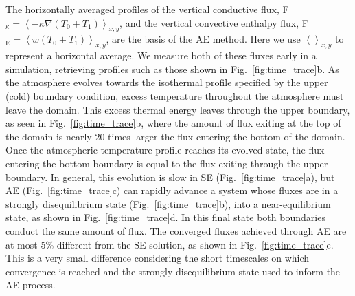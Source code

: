 \documentclass[aps, pre, onecolumn, nofootinbib, notitlepage, groupedaddress, amsfonts, amssymb, amsmath, longbibliography]{revtex4-1}
\newcommand{\angles}[1]{\ensuremath{\left\langle #1 \right\rangle}}
\newcommand{\grad}{\ensuremath{\nabla}}
\begin{document}
The horizontally averaged profiles of the vertical conductive flux, 
F$_{\kappa} = \angles{-\kappa\grad(T_0 + T_1)}_{x,y}$, and the vertical convective enthalpy flux,
F$_{\text{E}} = \angles{w(T_0 + T_1)}_{x,y}$, are the basis of the AE method.
Here we use $\angles{}_{x,y}$ to represent a horizontal average. We measure
both of these fluxes early in a simulation, retrieving profiles such as
those shown in Fig.~\ref{fig:time_trace}b.
As the atmosphere evolves towards
the isothermal profile specified by the upper (cold) boundary condition, excess
temperature throughout the atmosphere must leave the domain. This excess thermal
energy leaves through the upper boundary, as seen in 
Fig.~\ref{fig:time_trace}b, where the amount of flux exiting at the top of the domain
is nearly 20 times larger the flux entering the bottom of the domain. Once the atmospheric
temperature profile reaches its evolved state, the flux entering the bottom boundary
is equal to the flux exiting through the upper boundary.  In general, this 
evolution is slow in SE (Fig.~\ref{fig:time_trace}a), but AE (Fig.~\ref{fig:time_trace}c)
can rapidly advance a system whose fluxes are in a strongly disequilibrium state (Fig.~\ref{fig:time_trace}b),
into a near-equilibrium state, as shown in Fig.~\ref{fig:time_trace}d. In
this final state both boundaries conduct the same amount of flux.
The converged fluxes achieved through AE are at most 5\% different from the SE solution, 
as shown in Fig.~\ref{fig:time_trace}e. 
This is a very small difference considering the short timescales on which convergence
is reached and the strongly disequilibrium state used to inform the AE process.
\end{document}
